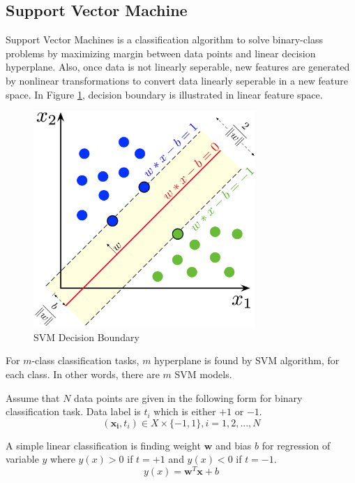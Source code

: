 \subsection{Support Vector Machine}
Support Vector Machines \cite{cortes_support_1995} is a classification algorithm to solve binary-class problems by maximizing margin between data points and linear decision hyperplane. Also, once data is not linearly seperable, new features are generated by nonlinear transformations to convert data linearly seperable in a new feature space. In Figure \ref{fig:svm_margin}, decision boundary is illustrated in linear feature space.

\begin{figure}
	\centering
	\includegraphics[width=0.75\textwidth]{./figures/ml_theory/SVM_margin.png}
	\caption{SVM Decision Boundary}
	\label{fig:svm_margin}
\end{figure}

For $m$-class classification tasks, $m$ hyperplane is found by SVM algorithm, for each class. In other words, there are $m$ SVM models.

Assume that $N$ data points are given in the following form for binary classification task. Data label is $t_i$ which is either $+1$ or $-1$.
\begin{equation}
(\boldsymbol{x_i}, t_i) \in X \times \{-1,1\}, i=1,2,...,N
\end{equation}

A simple linear classification is finding weight $\boldsymbol{w}$ and bias $b$ for regression of variable $y$ where $y(x)>0$ if $t=+1$ and $y(x)<0$ if $t=-1$.
\begin{equation}
y(x) = \boldsymbol{w}^T \boldsymbol{x} + b
\end{equation}



